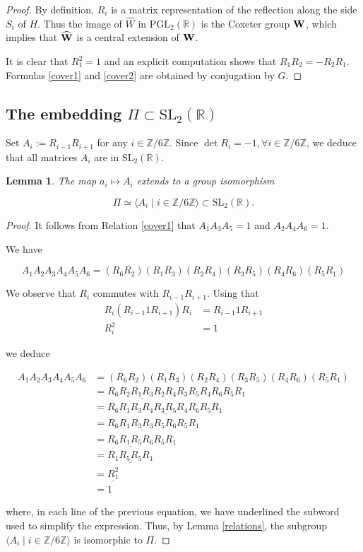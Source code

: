 \documentclass[12pt]{amsart}
\newcommand{\R}{\mathbb{R}}
\newcommand{\Z}{\mathbb{Z}}
\newcommand{\PGL}{{\mathrm {PGL}}}
\newcommand{\SL}{{\mathrm {SL}}}
\newtheorem{lemma}{Lemma}
\begin{document}
\begin{proof} By definition, $R_i$ is a matrix representation of the reflection along
the side $S_i$ of $H$. Thus the image of $\widehat{W}$ in $\PGL_2(\R)$ is the Coxeter group 
$\bf {W}$, which implies that $\widehat{\bf W}$  is a central extension of
$\bf{W}$.

It is clear that $R_1^2=1$ and an explicit computation shows that 
$R_1R_2=-R_2R_1$. Formulas \ref{cover1} and \ref{cover2} are obtained by conjugation by $G$.
\end{proof}

\subsection{The embedding $\Pi\subset \SL_2(\R)$}

Set $A_i:=R_{i-1}R_{i+1}$ for any $i\in\Z/6\Z$. Since $\det R_i=-1, \forall i\in\Z/6\Z$,
we deduce that all matrices $A_i$ are in $\SL_2(\R)$.

\begin{lemma} The map $a_i\mapsto A_i$ extends to a group isomorphism

 $$\Pi\simeq \langle A_i\mid i\in\Z/6\Z\rangle\subset \SL_2(\R).$$
\end{lemma}

\begin{proof} It follows from Relation \ref{cover1} that 
$A_1A_3A_5=1$ and $A_2A_4A_6=1$.

We have 

$$A_1A_2A_3A_4A_5A_6=(R_6R_2)(R_1R_3)(R_2R_4)(R_3R_5)(R_4R_6)(R_5 R_1)$$

We observe that $R_i$ commutes with $R_{i-1}R_{i+1}$.
Using that 
\begin{align*}
R_i(R_{i-1}1R_{i+1})R_i&=R_{i-1}1R_{i+1}\\
R_i^2&=1
\end{align*}

 we deduce

\begin{align*}
A_1A_2A_3A_4A_5A_6&=(R_6R_2)(R_1R_3)(R_2R_4)(R_3R_5)(R_4R_6)(R_5 R_1)\\
&=R_6\underline{R_2R_1R_3R_2}R_4R_3R_5R_4R_6R_5 R_1\\
&=R_6R_1R_3\underline{R_4R_3R_5R_4}R_6R_5 R_1\\
&=R_6R_1\underline{R_3R_3}R_5R_6R_5 R_1 \\
&=\underline{R_6R_1R_5R_6}R_5 R_1\\
&=R_1\underline{R_5R_5} R_1\\
&=\underline{R_1^2}\\
&=1
\end{align*}

\noindent where, in each line of the previous equation, we have underlined the subword used to
simplify the expression. Thus, by Lemma \ref{relations}, 
the  subgroup $\langle A_i\mid i\in\Z/6\Z\rangle$ is isomorphic to
$\Pi$.
\end{proof}
\end{document}
